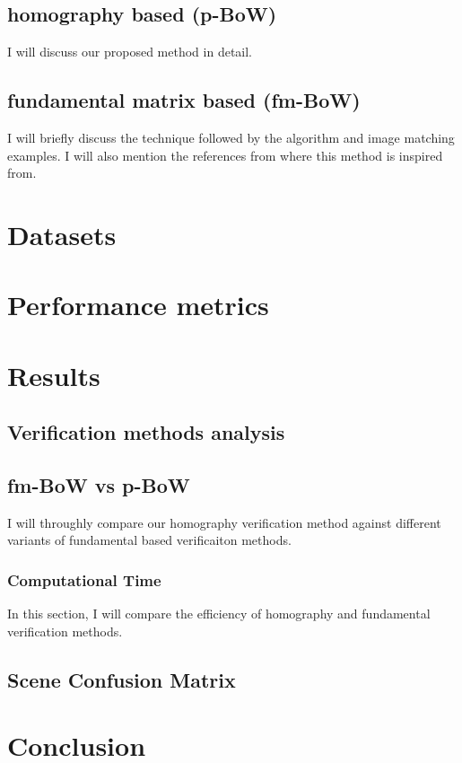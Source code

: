 \subsection{homography based (p-BoW)}
I will discuss our proposed method in detail. 

\subsection{fundamental matrix based (fm-BoW)}
I will briefly discuss the technique followed 
by the algorithm and image matching examples.
I will also mention the references from where 
this method is inspired from.

\section{Datasets}

\section{Performance metrics}

\section{Results}
\subsection{Verification methods analysis}

\subsection{fm-BoW vs p-BoW}
I will throughly compare our homography verification 
method against different variants of 
fundamental based verificaiton methods.

\subsubsection{Computational Time}
In this section, I will compare the efficiency 
of homography and fundamental verification methods.
\subsection{Scene Confusion Matrix}
\section{Conclusion}
